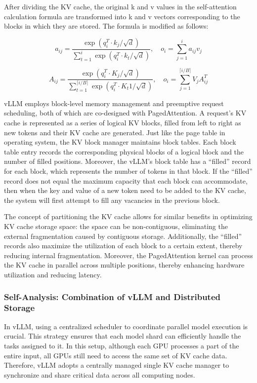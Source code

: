\documentclass[conference]{IEEEtran}
\begin{document}
After dividing the KV cache, the original k and v values in the self-attention calculation formula are transformed into k and v vectors corresponding to the blocks in which they are stored. The formula is modified as follows:

\[a_{ij} = \frac{\exp(q_i^{T} \cdot k_j / \sqrt{d})}{\sum_{t=1}^{i} \exp(q_i^{T} \cdot k_t / \sqrt{d})}, \quad o_i = \sum_{j=1}^{i} a_{ij} v_j\]

\[A_{ij} = \frac{\exp(q_i^{T} \cdot K_j / \sqrt{d})}{\sum_{t=1}^{\lceil {i/B} \rceil} \exp(q_i^{T} \cdot K_t1 / \sqrt{d})}, \quad o_i = \sum_{j=1}^{\lceil {i/B} \rceil} V_j A_{ij}^{T}\]

vLLM employs block-level memory management and preemptive request scheduling, both of which are co-designed with PagedAttention. A request’s KV cache is represented as a series of logical KV blocks, filled from left to right as new tokens and their KV cache are generated. Just like the page table in operating system, the KV block manager maintains block tables. Each block table entry records the corresponding physical blocks of a logical block and the number of filled positions. Moreover, the vLLM’s block table has a “filled” record for each block, which represents the number of tokens in that block. If the “filled” record does not equal the maximum capacity that each block can accommodate, then when the key and value of a new token need to be added to the KV cache, the system will first attempt to fill any vacancies in the previous block.

The concept of partitioning the KV cache allows for similar benefits in optimizing KV cache storage space: the space can be non-contiguous, eliminating the external fragmentation caused by contiguous storage. Additionally, the “filled” records also maximize the utilization of each block to a certain extent, thereby reducing internal fragmentation. Moreover, the PagedAttention kernel can process the KV cache in parallel across multiple positions, thereby enhancing hardware utilization and reducing latency.

\subsubsection{Self-Analysis: Combination of vLLM and Distributed Storage}
In vLLM, using a centralized scheduler to coordinate parallel model execution is crucial. This strategy ensures that each model shard can efficiently handle the tasks assigned to it. In this setup, although each GPU processes a part of the entire input, all GPUs still need to access the same set of KV cache data. Therefore, vLLM adopts a centrally managed single KV cache manager to synchronize and share critical data across all computing nodes.
\end{document}
